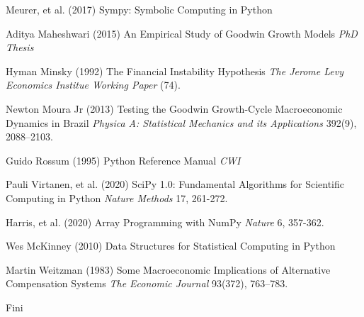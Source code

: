 \documentclass{beamer}
\begin{document}
\begin{frame}[allowframebreaks]
{\begin{thebibliography}{99}
\begin{tiny}
 Meurer, et al. (2017)
\newblock Sympy:  Symbolic Computing in Python

 Aditya Maheshwari (2015)
\newblock An Empirical Study of Goodwin Growth Models
\newblock \emph{PhD Thesis}

 Hyman Minsky (1992)
\newblock The Financial Instability Hypothesis
\newblock \emph{The Jerome Levy Economics Institue Working Paper} (74).

 Newton Moura Jr (2013)
\newblock Testing the Goodwin Growth-Cycle Macroeconomic Dynamics in Brazil
\newblock \emph{Physica A: Statistical Mechanics and its Applications} 392(9), 2088–2103.

 Guido Rossum (1995)
\newblock Python Reference Manual
\newblock \emph{CWI}

 Pauli Virtanen, et al. (2020)
\newblock SciPy 1.0: Fundamental Algorithms for Scientific Computing in Python
\newblock \emph{Nature Methods} 17, 261-272.

 Harris, et al. (2020)
\newblock Array Programming with NumPy
\newblock \emph{Nature} 6, 357-362.

 Wes McKinney (2010)
\newblock Data Structures for Statistical Computing in Python

 Martin Weitzman (1983)
\newblock Some  Macroeconomic  Implications  of  Alternative  Compensation Systems
\newblock \emph{The Economic Journal } 93(372), 763–783.

\end{tiny}
\end{thebibliography}
}
\end{frame}


\begin{frame}
\Huge{\centerline{Fini}}
\end{frame}

\end{document}
